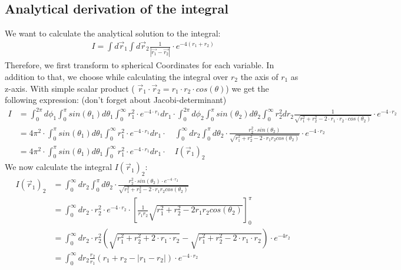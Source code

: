 \documentclass[10pt,a4paper]{article}
\begin{document}
\subsection{Analytical derivation of the integral }

We want to calculate the analytical solution to the integral:
\begin{align*}
I = \int d\vec{r}_1 \int d\vec{r}_2 \frac{1}{|\vec{r_1}-\vec{r_2}|} \cdot e^{-4(r_1+r_2)}
\end{align*}
Therefore, we first transform to spherical Coordinates for each variable. In addition to that, we choose while calculating the integral over $r_2$ the axis of $r_1$ as z-axis. With simple scalar product ( $\vec{r}_1 \cdot \vec{r}_2= r_1 \cdot r_2 \cdot cos( \theta)$) we get the following expression: (don't forget about Jacobi-determinant)
\begin{align}
I&=\int_{0}^{2 \pi} d\phi_1 \int_{0}^{ \pi} sin(\theta_1) d\theta_1 \int_{0}^{\infty}  r_1^2 \cdot e^{-4 \cdot r_1} dr_1\cdot \int_{0}^{2 \pi} d\phi_2 \int_{0}^{ \pi} sin(\theta_2) d\theta_2 \int_{0}^{\infty}  r_2^2 dr_2 \frac{1}{\sqrt{r_1^2+r_2^2-2 \cdot r_1 \cdot r_2\cdot cos(\theta_2)}} \cdot e^{-4 \cdot r_2}\\
&= 4 \pi^2 \cdot \int_{0}^{ \pi} sin(\theta_1) d\theta_1 \int_{0}^{\infty}  r_1^2 \cdot e^{-4 \cdot r_1} dr_1 \cdot \quad \int_{0}^{\infty} dr_2 \int_{0}^{\pi} d\theta_2 \cdot \frac{r_2^2 \cdot sin(\theta_2)}{\sqrt{r_1^2+r_2^2-2 \cdot r_1 r_2 cos(\theta_2)}}\cdot e^{-4 \cdot r_2}\\
&= 4 \pi^2 \cdot \int_{0}^{ \pi} sin(\theta_1) d\theta_1 \int_{0}^{\infty}  r_1^2 \cdot e^{-4 \cdot r_1} dr_1 \cdot \quad I(\vec{r}_1)_2
\end{align}
We now calculate the integral $I(\vec{r}_1)_2$:
\begin{align}
I(\vec{r}_1)_2&= \int_{0}^{\infty} dr_2 \int_{0}^{\pi} d\theta_2 \cdot \frac{r_2^2 \cdot sin(\theta_2)\cdot e^{-4 \cdot r_2}}{\sqrt{r_1^2+r_2^2-2 \cdot r_1 r_2 cos(\theta_2)}}\\
&= \int_{0}^{\infty} dr_2 \cdot r_2^2\cdot e^{-4 \cdot r_2} \cdot \left[ \frac{1}{r_1 r_2} \sqrt{r_1^2+r_2^2 - 2 r_1 r_2 cos(\theta_2)} \right]_0^{\pi}\\
&= \int_{0}^{\infty} dr_2 \cdot r_2^2 \left( \sqrt{r_1^2+r_2^2+2 \cdot r_1 \cdot r_2} -\sqrt{r_1^2+r_2^2-2 \cdot r_1 \cdot r_2}\right) \cdot e^{-4r_2}\\ 
&= \int_{0}^{\infty} dr_2 \frac{r_2}{r_1} \left( r_1+r_2 - |r_1-r_2| \right) \cdot e^{-4 \cdot r_2}
\end{align}
\end{document}
